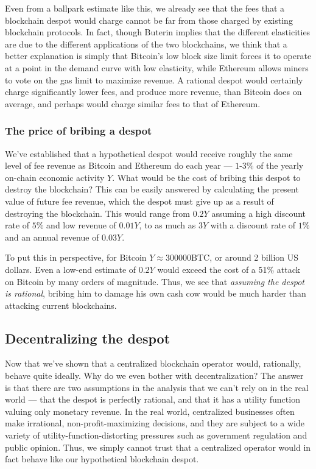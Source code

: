 \documentclass[letterpaper,12pt,oneside]{article}
\begin{document}
Even from a ballpark estimate like this, we already see that the fees that a blockchain despot would charge cannot be far from those charged by existing blockchain protocols. In fact, though Buterin implies that the different elasticities are due to the different applications of the two blockchains, we think that a better explanation is simply that Bitcoin's low block size limit forces it to operate at a point in the demand curve with low elasticity, while Ethereum allows miners to vote on the gas limit to maximize revenue. A rational despot would certainly charge significantly lower fees, and produce more revenue, than Bitcoin does on average, and perhaps would charge similar fees to that of Ethereum.


\subsubsection{The price of bribing a despot}

We've established that a hypothetical despot would receive roughly the same level of fee revenue as Bitcoin and Ethereum do each year --- $1$-$3\%$ of the yearly on-chain economic activity $Y$. What would be the cost of bribing this despot to destroy the blockchain? This can be easily answered by calculating the present value of future fee revenue, which the despot must give up as a result of destroying the blockchain. This would range from $0.2Y$ assuming a high discount rate of $5\%$ and low revenue of $0.01Y$, to as much as $3Y$ with a discount rate of $1\%$ and an annual revenue of $0.03Y$.

To put this in perspective, for Bitcoin $Y \approx 300000 \mathrm{BTC}$, or around 2 billion US dollars. Even a low-end estimate of $0.2Y$ would exceed the cost of a 51\% attack on Bitcoin by many orders of magnitude. Thus, we see that \emph{assuming the despot is rational}, bribing him to damage his own cash cow would be much harder than attacking current blockchains.

\subsection{Decentralizing the despot}

Now that we've shown that a centralized blockchain operator would, rationally, behave quite ideally. Why do we even bother with decentralization? The answer is that there are two assumptions in the analysis that we can't rely on in the real world --- that the despot is perfectly rational, and that it has a utility function valuing only monetary revenue. In the real world, centralized businesses often make irrational, non-profit-maximizing decisions, and they are subject to a wide variety of utility-function-distorting pressures such as government regulation and public opinion. Thus, we simply cannot trust that a centralized operator would in fact behave like our hypothetical blockchain despot.
\end{document}

